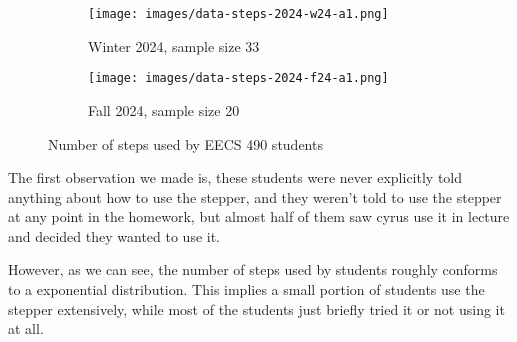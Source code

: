 \begin{figure}[ht]
  \centering
  \begin{minipage}{.40\linewidth}
    \begin{subfigure}{\linewidth}
      \texttt{[image: images/data-steps-2024-w24-a1.png]}
      \caption{Winter 2024, sample size 33}
      \label{fig:eval-num-steps-w24}
    \end{subfigure}
  \end{minipage}
  \quad
  \begin{minipage}{.40\linewidth}
    \begin{subfigure}{\linewidth}
      \texttt{[image: images/data-steps-2024-f24-a1.png]}
      \caption{Fall 2024, sample size 20}
      \label{fig:eval-num-steps-f24}
    \end{subfigure}
  \end{minipage}
  \caption{Number of steps used by EECS 490 students}
  \label{fig:eval-num-steps}
\end{figure}

The first observation we made is, these students were never explicitly
told anything about how to use the stepper, and they weren't told to
use the stepper at any point in the homework, but almost half of them
saw cyrus use it in lecture and decided they wanted to use it.

However, as we can see, the number of steps used by students roughly
conforms to a exponential distribution. This implies a small portion
of students use the stepper extensively, while most of the students
just briefly tried it or not using it at all.

